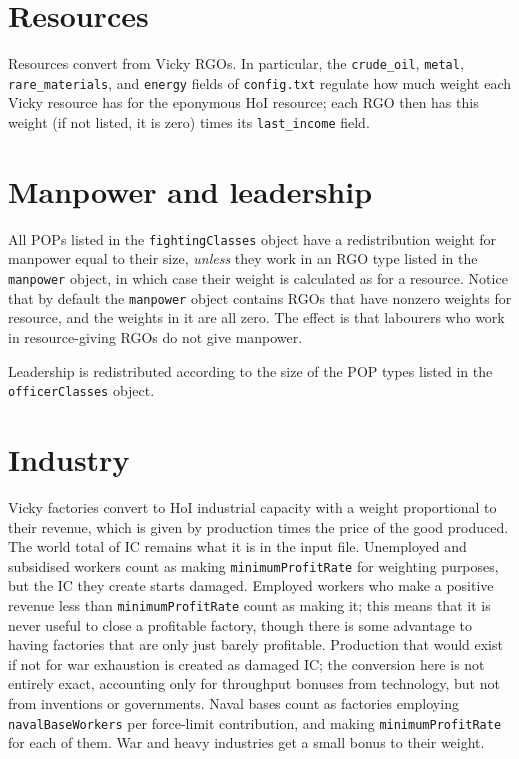 \documentclass[12pt,ebook,oneside]{book}
\begin{document}
\section{Resources}

Resources convert from Vicky RGOs. In particular, the
\texttt{crude\_oil}, \texttt{metal}, \texttt{rare\_materials}, and
\texttt{energy} fields of \texttt{config.txt} regulate how much weight
each Vicky resource has for the eponymous HoI resource; each RGO then
has this weight (if not listed, it is zero) times its
\texttt{last\_income} field. 

\section{Manpower and leadership}

All POPs listed in the \texttt{fightingClasses} object have a
redistribution weight for manpower equal to their size, \emph{unless}
they work in an RGO type listed in the \texttt{manpower} object, in
which case their weight is calculated as for a resource. Notice that
by default the \texttt{manpower} object contains RGOs that have
nonzero weights for resource, and the weights in it are all zero. The
effect is that labourers who work in resource-giving RGOs do not give
manpower. 

Leadership is redistributed according to the size of the POP types
listed in the \texttt{officerClasses} object. 

\section{Industry} 

Vicky factories convert to HoI industrial capacity with a weight
proportional to their revenue, which is given by production times the
price of the good produced. The world total of IC remains what it
is in the input file. Unemployed and subsidised workers count as
making \texttt{minimumProfitRate} for weighting purposes, but the IC
they create starts damaged. Employed workers who make a positive
revenue less than \texttt{minimumProfitRate} count as making it; this
means that it is never useful to close a profitable factory, though
there is some advantage to having factories that are only just barely
profitable. Production that would exist if not for war exhaustion is
created as damaged IC; the conversion here is not entirely exact,
accounting only for throughput bonuses from technology, but not from
inventions or governments. Naval bases count as factories employing
\texttt{navalBaseWorkers} per force-limit contribution, and making
\texttt{minimumProfitRate} for each of them. War and heavy industries
get a small bonus to their weight. 
\end{document}
